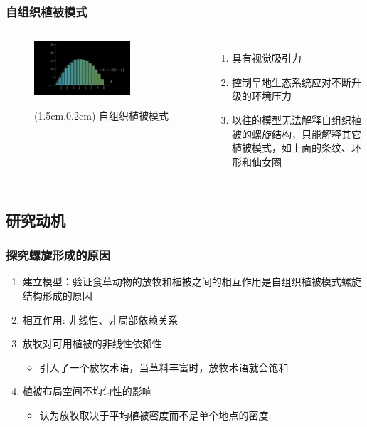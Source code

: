 \documentclass[aspectratio=169, 12pt, utf8, mathserif]{ctexbeamer} %
\begin{document}
\begin{frame}
	\frametitle{自组织植被模式}
	\begin{columns}
		\column{0.5\paperwidth} %
		\begin{figure}[tbph]
			\centering
			\includegraphics[width=0.7\textwidth]{figures/1}
			\begin{textblock*}{5cm}(1.5cm,0.2cm)
				\small 自组织植被模式
			\end{textblock*}
		\end{figure}
		
		
		\column{0.46\paperwidth}
		\begin{enumerate}%
			\item 具有视觉吸引力\\
			\item 控制旱地生态系统应对不断升级的环境压力\\
			\item 以往的模型无法解释自组织植被的螺旋结构，只能解释其它植被模式，如上面的条纹、环形和仙女圈
		\end{enumerate}
	\end{columns}
	\end{frame}
	
	
	\subsection{研究动机}
	\begin{frame}
		\frametitle{探究螺旋形成的原因}
		\begin{enumerate}
			\item 建立模型：验证食草动物的放牧和植被之间的相互作用是自组织植被模式螺旋结构形成的原因
			\item 相互作用: 非线性、非局部依赖关系
			\item 放牧对可用植被的非线性依赖性
			\begin{itemize}
				\item 引入了一个放牧术语，当草料丰富时，放牧术语就会饱和
			\end{itemize}
			\item 植被布局空间不均匀性的影响
			\begin{itemize}
				\item 认为放牧取决于平均植被密度而不是单个地点的密度
			\end{itemize}
		\end{enumerate}
	\end{frame}
	
\end{document}
